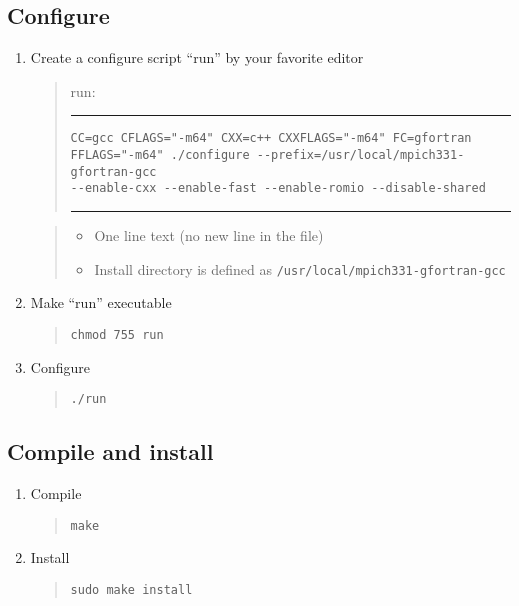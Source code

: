 \documentclass[11pt]{article}
\begin{document}
\subsection{Configure}
\begin{enumerate}
\item
Create a configure script ``run'' by your favorite editor

\begin{quote}
run:
\hrule
\begin{verbatim}
CC=gcc CFLAGS="-m64" CXX=c++ CXXFLAGS="-m64" FC=gfortran
FFLAGS="-m64" ./configure --prefix=/usr/local/mpich331-gfortran-gcc
--enable-cxx --enable-fast --enable-romio --disable-shared
\end{verbatim}
\hrule
\end{quote}


\begin{quote}
\begin{itemize}
\item
One line text (no new line in the file)
\item
Install directory is defined as
\verb|/usr/local/mpich331-gfortran-gcc|
\end{itemize}
\end{quote}

\item
Make ``run'' executable 
\begin{quote}
\begin{verbatim}
chmod 755 run
\end{verbatim}
\end{quote}

\item
Configure
\begin{quote}
\begin{verbatim}
./run
\end{verbatim}
\end{quote}
\end{enumerate}

\subsection{Compile and install}
\begin{enumerate}
\item
Compile
\begin{quote}
\begin{verbatim}
make
\end{verbatim}
\end{quote}
\item
Install
\begin{quote}
\begin{verbatim}
sudo make install
\end{verbatim}
\end{quote}
\end{enumerate}
\end{document}
